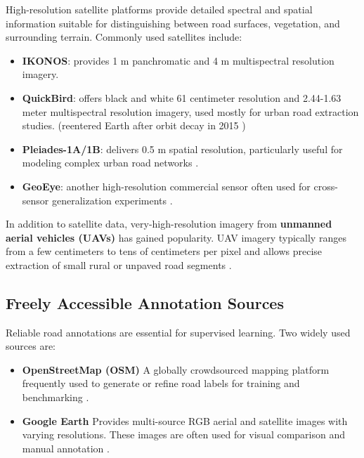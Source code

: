 \documentclass[conference]{IEEEtran}
\begin{document}
High-resolution satellite platforms provide detailed spectral and spatial
information suitable for distinguishing between road surfaces, vegetation, and
surrounding terrain. Commonly used satellites include:

\begin{itemize}
    \item \textbf{IKONOS}: provides 1 m panchromatic and 4 m multispectral resolution imagery. \cite{JIN2005257}
    \item \textbf{QuickBird}: offers black and white 61 centimeter resolution and 2.44-1.63 meter multispectral resolution imagery, used mostly for urban road extraction studies. (reentered Earth after orbit decay in 2015 \cite{QuickBird2} \cite{QuickBird2_wiki}) \cite{JIN2005257} \cite{Wang18062015}
    \item \textbf{Pleiades-1A/1B}: delivers 0.5 m spatial resolution, particularly useful for modeling complex urban road networks \cite{rs12182985}.
    \item \textbf{GeoEye}: another high-resolution commercial sensor often used for cross-sensor generalization experiments \cite{rs12182985}.
\end{itemize}

In addition to satellite data, very-high-resolution imagery from
\textbf{unmanned aerial vehicles (UAVs)} has gained popularity. UAV imagery
typically ranges from a few centimeters to tens of centimeters per pixel and
allows precise extraction of small rural or unpaved road segments
\cite{8628717}.

\subsection{Freely Accessible Annotation Sources}

Reliable road annotations are essential for supervised learning. Two widely
used sources are:

\begin{itemize}
    \item \textbf{OpenStreetMap (OSM)}   A globally crowdsourced mapping platform frequently used to generate or refine road labels for training and benchmarking \cite{rs16050839} \cite{Wang18062015}.
    \item \textbf{Google Earth}   Provides multi-source RGB aerial and satellite images with varying resolutions. These images are often used for visual comparison and manual annotation \cite{7876793} \cite{Wang18062015} \cite{8106771}.
\end{itemize}
\end{document}
